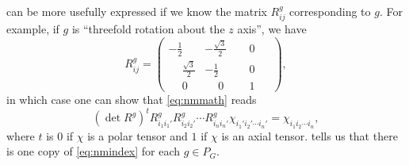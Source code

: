  can be more usefully expressed if we know the matrix $R^g_{ij}$ corresponding to $g$.
For example, if $g$ is ``threefold rotation about the $z$ axis'', we have
\begin{equation}
R^g_{ij} = \left(\begin{matrix}
-\frac{1}{2} & -\frac{\sqrt{3}}{2} & \phantom{-}0\phantom{-} \\
\phantom{-}\frac{\sqrt{3}}{2} & -\frac{1}{2} & \phantom{-}0\phantom{-} \\
\phantom{-}0 & \phantom{-}0 & \phantom{-}1\phantom{-}
\end{matrix}\right),
\end{equation}
in which case one can show that \cref{eq:nmmath} reads
\begin{equation}\label{eq:nmindex}
(\det{R^g})^tR^g_{i_1i_1'}R^g_{i_2i_2'}\cdots R^g_{i_ni_n'}\chi_{i_1'i_2'\cdots i_n'} = \chi_{i_1i_2\cdots i_n},
\end{equation}
where $t$ is $0$ if $\chi$ is a polar tensor and $1$ if $\chi$ is an axial tensor.
 tells us that there is one copy of \cref{eq:nmindex} for each $g \in P_G$. 


